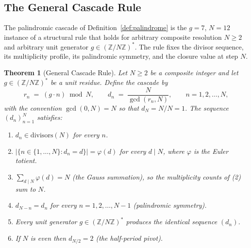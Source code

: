 \documentclass[11pt,a4paper]{article}
\newtheorem{theorem}{Theorem}[section]
\theoremstyle{definition}
\theoremstyle{remark}
\begin{document}
\subsection{The General Cascade Rule}\label{subsec:general-cascade-rule}

The palindromic cascade of Definition~\ref{def:palindrome} is the $g=7$, $N=12$ instance of a structural rule that holds for arbitrary composite resolution $N\ge 2$ and arbitrary unit generator $g \in (\mathbb{Z}/N\mathbb{Z})^{*}$. The rule fixes the divisor sequence, its multiplicity profile, its palindromic symmetry, and the closure value at step $N$.

\begin{theorem}[General Cascade Rule]\label{thm:general-cascade}
Let $N\ge 2$ be a composite integer and let $g\in(\mathbb{Z}/N\mathbb{Z})^{*}$ be a unit residue. Define the cascade by
\[
r_{n} \;=\; (g\cdot n)\bmod N, \qquad d_{n} \;=\; \frac{N}{\gcd(r_{n},N)}, \qquad n = 1,2,\ldots,N,
\]
with the convention $\gcd(0,N)=N$ so that $d_{N} = N/N = 1$. The sequence $(d_{n})_{n=1}^{N}$ satisfies:
\begin{enumerate}[leftmargin=*,label=\textnormal{(\arabic*)}]
\item $d_{n} \in \mathrm{divisors}(N)$ for every $n$.
\item $\bigl|\{n\in\{1,\ldots,N\} : d_{n} = d\}\bigr| = \varphi(d)$ for every $d\mid N$, where $\varphi$ is the Euler totient.
\item $\sum_{d\mid N}\varphi(d) = N$ (the Gauss summation), so the multiplicity counts of \textnormal{(2)} sum to $N$.
\item $d_{N-n} = d_{n}$ for every $n = 1,2,\ldots,N-1$ (palindromic symmetry).
\item Every unit generator $g\in(\mathbb{Z}/N\mathbb{Z})^{*}$ produces the identical sequence $(d_{n})$.
\item If $N$ is even then $d_{N/2} = 2$ (the half-period pivot).
\end{enumerate}
\end{theorem}
\end{document}
